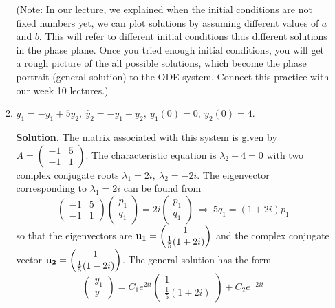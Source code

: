 \documentclass[11pt,a4paper,twoside]{article}
\begin{document}
\begin{enumerate}[\bfseries A.]
\begin{enumerate}[\bfseries 1)]
			(Note: In our lecture, we explained when the initial conditions are not fixed numbers yet, we can plot solutions by assuming different values of $a$ and $b$. This will refer to different initial conditions thus different solutions in the phase plane. Once you tried enough initial conditions, you will get a rough picture of the all possible solutions, which become the phase portrait (general solution) to the ODE system. Connect this practice with our week 10 lectures.)
			\item $\dot{y_1} = -y_1 + 5y_2,\ \dot{y_2} = -y_1 + y_2,\ y_1(0) = 0,\ y_2(0) = 4$.\par
			\textbf{Solution.} The matrix associated with this system is given by
			$
			A =
			\begin{pmatrix}
				-1 & 5\\
				-1 & 1
			\end{pmatrix}
			$.
			The characteristic equation is $\lambda_2 + 4 = 0$ with two complex conjugate roots $\lambda_1 = 2i,\ \lambda_2 = −2i$. The eigenvector corresponding to $\lambda_1 = 2i$ can be found from
			$$
			\begin{pmatrix}
				-1 & 5\\
				-1 & 1
			\end{pmatrix}
			\begin{pmatrix}
				p_1\\
				q_1
			\end{pmatrix}
			= 2i
			\begin{pmatrix}
				p_1\\
				q_1
			\end{pmatrix}\ \Rightarrow\ 
			5q_1 = (1+2i)p_1
			$$
			so that the eigenvectors are
			$
			\vb{u_1} =
			\begin{pmatrix}
				1\\
				\frac{1}{5}(1+2i)
			\end{pmatrix}
			$
			and the complex conjugate vector
			$
			\vb{u_2} =
			\begin{pmatrix}
				1\\
				\frac{1}{5}(1-2i)
			\end{pmatrix}
			$.
			The general solution has the form
			$$
			\begin{pmatrix}
				y_1\\
				y
			\end{pmatrix}
			= C_1e^{2it}
			\begin{pmatrix}
				1\\
				\frac{1}{5}(1+2i)
			\end{pmatrix} + C_2e^{-2it}
$$
\end{enumerate}
\end{enumerate}
\end{document}
